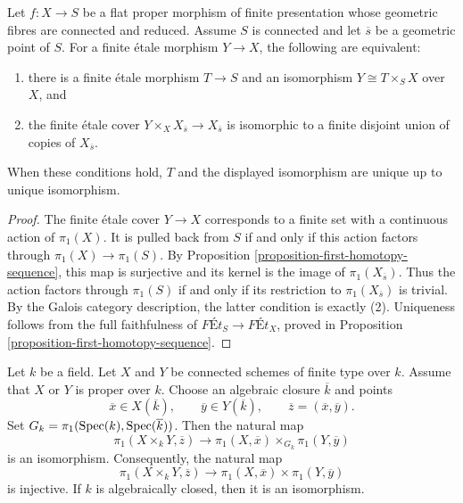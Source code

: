 \begin{lemma}
\label{lemma-finite-etale-descends-if-trivial-on-fibre}
\begin{reference}
\cite[Expos\'e 182, Corollaire 1, p. 214]{FGA}
\end{reference}
Let $f : X \to S$ be a flat proper morphism of finite presentation whose
geometric fibres are connected and reduced. Assume $S$ is connected and let
$\overline{s}$ be a geometric point of $S$. For a finite \'etale morphism
$Y \to X$, the following are equivalent:
\begin{enumerate}
\item there is a finite \'etale morphism $T \to S$ and an isomorphism
$Y \cong T \times_S X$ over $X$, and
\item the finite \'etale cover
$Y \times_X X_{\overline{s}} \to X_{\overline{s}}$ is isomorphic to a
finite disjoint union of copies of $X_{\overline{s}}$.
\end{enumerate}
When these conditions hold, $T$ and the displayed isomorphism are unique up
to unique isomorphism.
\end{lemma}

\begin{proof}
The finite \'etale cover $Y \to X$ corresponds to a finite set with a
continuous action of $\pi_1(X)$. It is pulled back from $S$ if and only if
this action factors through $\pi_1(X) \to \pi_1(S)$. By
Proposition \ref{proposition-first-homotopy-sequence}, this map is surjective
and its kernel is the image of $\pi_1(X_{\overline{s}})$. Thus the action
factors through $\pi_1(S)$ if and only if its restriction to
$\pi_1(X_{\overline{s}})$ is trivial. By the Galois category description,
the latter condition is exactly (2). Uniqueness follows from the full
faithfulness of $\textit{F\'Et}_S \to \textit{F\'Et}_X$, proved in
Proposition \ref{proposition-first-homotopy-sequence}.
\end{proof}

\begin{lemma}
\label{lemma-fundamental-group-product-one-proper}
\begin{reference}
\cite[Expos\'e 182, Corollaire 5, p. 215, with the 1962 correction]{FGA}
\end{reference}
Let $k$ be a field. Let $X$ and $Y$ be connected schemes of finite type
over $k$. Assume that $X$ or $Y$ is proper over $k$. Choose an
algebraic closure $\overline{k}$ and points
$$
\overline{x} \in X(\overline{k}), \qquad
\overline{y} \in Y(\overline{k}), \qquad
\overline{z} = (\overline{x}, \overline{y}).
$$
Set $G_k = \pi_1(\mathop{\mathrm{Spec}}(k), \mathop{\mathrm{Spec}}(\overline{k}))$. Then the natural map
$$
\pi_1(X \times_k Y, \overline{z}) \longrightarrow
\pi_1(X, \overline{x}) \times_{G_k} \pi_1(Y, \overline{y})
$$
is an isomorphism. Consequently, the natural map
$$
\pi_1(X \times_k Y, \overline{z}) \longrightarrow
\pi_1(X, \overline{x}) \times \pi_1(Y, \overline{y})
$$
is injective. If $k$ is algebraically closed, then it is an isomorphism.
\end{lemma}

